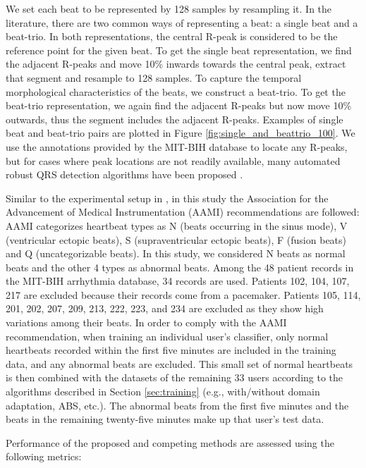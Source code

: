 \documentclass[journal,transmag]{IEEEtran}
\begin{document}
We set each beat to be represented by 128 samples by resampling it. In the literature, there are two common ways of representing a beat: a single beat and a beat-trio. In both representations, the central R-peak is considered to be the reference point for the given beat. To get the single beat representation, we find the adjacent R-peaks and move 10\% inwards towards the central peak, extract that segment and resample to 128 samples. To capture the temporal morphological characteristics of the beats, we construct a beat-trio. To get the beat-trio representation, we again find the adjacent R-peaks but now move 10\% outwards, thus the segment includes the adjacent R-peaks. Examples of single beat and beat-trio pairs are plotted in Figure \ref{fig:single_and_beattrio_100}. We use the annotations provided by the MIT-BIH database to locate any R-peaks, but for cases where peak locations are not readily available, many automated robust QRS detection algorithms have been proposed \cite{pantompkins, li1995detection}.

Similar to the experimental setup in \cite{kiranyaz2017personalized}, in this study the Association for the Advancement of Medical Instrumentation (AAMI) recommendations \cite{AAMI} are followed: AAMI categorizes heartbeat types as N (beats occurring in the sinus mode), V (ventricular ectopic beats), S (supraventricular ectopic beats), F (fusion beats) and Q (uncategorizable beats).  In this study, we considered N beats as normal beats and the other 4 types as abnormal beats. Among the 48 patient records in the MIT-BIH arrhythmia database, 34 records are used. Patients 102, 104, 107, 217 are excluded because their records come from a pacemaker. Patients 105, 114, 201, 202, 207, 209, 213, 222, 223, and 234 are excluded as they show high variations among their beats. In order to comply with the AAMI recommendation, when training an individual user's classifier, only normal heartbeats recorded within the first five minutes are included in the training data, and any abnormal beats are excluded. This small set of normal heartbeats is then combined with the datasets of the remaining 33 users according to the algorithms described in Section \ref{sec:training} (e.g., with/without domain adaptation, ABS, etc.). The abnormal beats from the first five minutes and the beats in the remaining twenty-five minutes make up that user's test data.

Performance of the proposed and competing methods are assessed using the following metrics:
\end{document}
